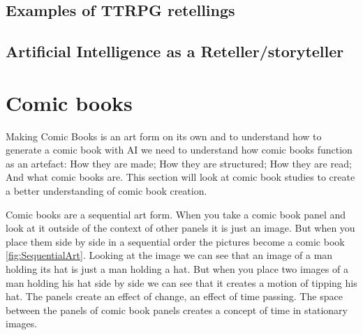 
\subsection{Examples of TTRPG retellings}

\subsection{Artificial Intelligence as a Reteller/storyteller}

\section{Comic books}
Making Comic Books is an art form on its own and to understand how to generate a comic book with AI we need to understand how comic books function as an artefact: How they are made; How they are structured; How they are read; And what comic books are. This section will look at comic book studies to create a better understanding of comic book creation.

Comic books are a sequential art form\cite{eisner2008comics}. When you take a comic book panel and look at it outside of the context of other panels it is just an image. But when you place them side by side in a sequential order the pictures become a comic book \ref{fig:SequentialArt}. Looking at the image we can see that an image of a man holding its hat is just a man holding a hat. But when you place two images of a man holding his hat side by side we can see that it creates a motion of tipping his hat. The panels create an effect of change, an effect of time passing. The space between the panels of comic book panels creates a concept of time in stationary images. 

